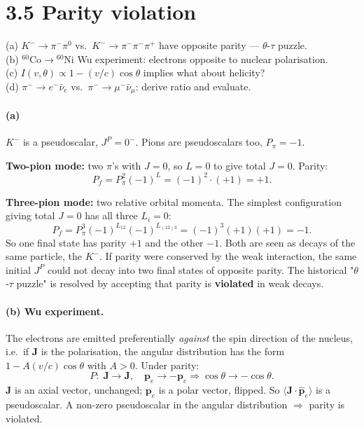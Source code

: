 \documentclass[11pt]{article}
\newcommand{\Q}[1]{\begin{question}#1\end{question}}
\begin{document}
\section*{3.5 \quad Parity violation}

\Q{(a) $K^-\to\pi^-\pi^0$ vs.\ $K^-\to\pi^-\pi^-\pi^+$ have opposite parity --- $\theta$-$\tau$ puzzle.\\
(b) $^{60}\mathrm{Co}\to{}^{60}\mathrm{Ni}$ Wu experiment: electrons opposite to nuclear polarisation.\\
(c) $I(v,\theta)\propto 1-(v/c)\cos\theta$ implies what about helicity?\\
(d) $\pi^-\to e^-\bar\nu_e$ vs.\ $\pi^-\to\mu^-\bar\nu_\mu$: derive ratio and evaluate.}

\paragraph{(a)} $K^-$ is a pseudoscalar, $J^P=0^-$. Pions are pseudoscalars too, $P_\pi=-1$.

\textbf{Two-pion mode:} two $\pi$'s with $J=0$, so $L=0$ to give total $J=0$. Parity:
\[
P_f=P_\pi^{2}(-1)^{L}=(-1)^{2}\cdot(+1)=+1.
\]

\textbf{Three-pion mode:} two relative orbital momenta. The simplest configuration giving total $J=0$ has all three $L_i=0$:
\[
P_f=P_\pi^{3}(-1)^{L_{12}}(-1)^{L_{(12)3}}=(-1)^{3}(+1)(+1)=-1.
\]
So one final state has parity $+1$ and the other $-1$. Both are seen as decays of the same particle, the $K^-$. If parity were conserved by the weak interaction, the same initial $J^P$ could not decay into two final states of opposite parity. The historical "$\theta$-$\tau$ puzzle" is resolved by accepting that parity is \textbf{violated} in weak decays.

\paragraph{(b) Wu experiment.} The electrons are emitted preferentially \emph{against} the spin direction of the nucleus, i.e.\ if $\mathbf{J}$ is the polarisation, the angular distribution has the form $1-A(v/c)\cos\theta$ with $A>0$. Under parity:
\[
P:\;\mathbf{J}\to\mathbf{J},\quad\mathbf{p}_e\to-\mathbf{p}_e\Rightarrow\cos\theta\to-\cos\theta.
\]
$\mathbf{J}$ is an axial vector, unchanged; $\mathbf{p}_e$ is a polar vector, flipped. So $\langle\mathbf{J}\cdot\hat{\mathbf{p}}_e\rangle$ is a pseudoscalar. A non-zero pseudoscalar in the angular distribution $\Rightarrow$ parity is violated.
\end{document}

